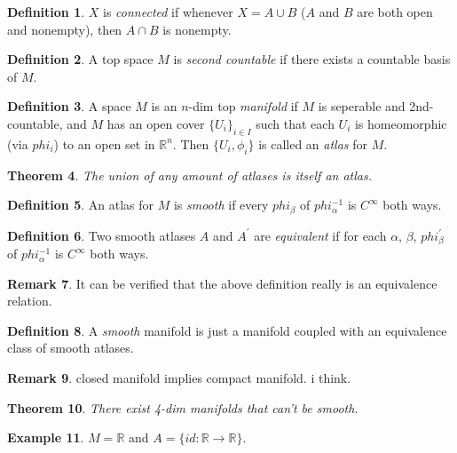\documentclass[11pt,leqno,oneside]{amsart}
\newcommand{\R}{{\mathbb R}} %
\newtheorem{thm}{Theorem}[section]
\theoremstyle{definition}
\newtheorem{defn}[thm]{Definition}
\newtheorem{example}[thm]{Example}
\newtheorem{rmk}[thm]{Remark}
\numberwithin{equation}{section}
\begin{document}
\begin{defn}
	$X$ is \emph{connected} if whenever $X = A \cup B$ ($A$ and $B$ are both open and nonempty), then $A \cap B$ is nonempty.
\end{defn}

\begin{defn}
	A top space $M$ is \emph{second countable} if there exists a countable basis of $M$.
\end{defn}

\begin{defn}
	A space $M$ is an $n$-dim top \emph{manifold} if $M$ is seperable and 2nd-countable, and $M$ has an open cover $\{U_i\}_{i \in I}$ such that each $U_i$ is homeomorphic (via $phi_i$) to an open set in $\R^n$.  Then $\{ U_i, \phi_i \}$ is called an \emph{atlas} for $M$.
\end{defn}
\begin{thm}
	The union of any amount of atlases is itself an atlas.
\end{thm}

\begin{defn}
	An atlas for $M$ is \emph{smooth} if every $phi_\beta$ of $phi_\alpha^{-1}$ is $C^\infty$ both ways.
\end{defn}

\begin{defn}
	Two smooth atlases $A$ and $A^\prime$ are \emph{equivalent} if for each $\alpha$, $\beta$, $phi_\beta^\prime$ of $phi_\alpha^{-1}$ is $C^\infty$ both ways.
\end{defn}
\begin{rmk}
	It can be verified that the above definition really is an equivalence relation.
\end{rmk}

\begin{defn}
	A \emph{smooth} manifold is just a manifold coupled with an equivalence class of smooth atlases.
\end{defn}

\begin{rmk}
	closed manifold implies compact manifold.  i think.
\end{rmk}

\begin{thm}
	There exist 4-dim manifolds that can't be smooth.
\end{thm}



\begin{example}
	$M = \R$ and $A = \{ id: \R \to \R \}$.
\end{example}
\end{document}
